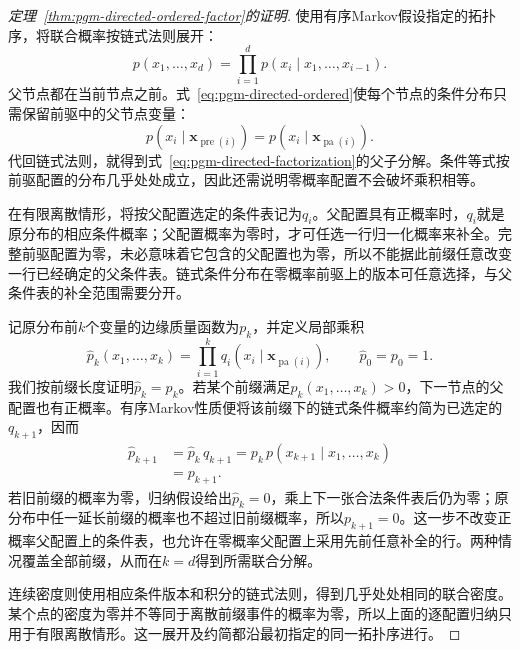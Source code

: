 \begin{proof}[定理~\ref{thm:pgm-directed-ordered-factor}的证明]
使用有序Markov假设指定的拓扑序，将联合概率按链式法则展开：
\[
  p(x_1,\ldots,x_d)=
  \prod_{i=1}^{d}p(x_i\mid x_1,\ldots,x_{i-1}).
\]
父节点都在当前节点之前。式~\eqref{eq:pgm-directed-ordered}使每个节点的条件分布只需保留前驱中的父节点变量：
\[
  p(x_i\mid\bm{x}_{\operatorname{pre}(i)})
    =p(x_i\mid\bm{x}_{\operatorname{pa}(i)}).
\]
代回链式法则，就得到式~\eqref{eq:pgm-directed-factorization}的父子分解。条件等式按前驱配置的分布几乎处处成立，因此还需说明零概率配置不会破坏乘积相等。

在有限离散情形，将按父配置选定的条件表记为$q_i$。父配置具有正概率时，$q_i$就是原分布的相应条件概率；父配置概率为零时，才可任选一行归一化概率来补全。完整前驱配置为零，未必意味着它包含的父配置也为零，所以不能据此前缀任意改变一行已经确定的父条件表。链式条件分布在零概率前驱上的版本可任意选择，与父条件表的补全范围需要分开。

记原分布前$k$个变量的边缘质量函数为$p_k$，并定义局部乘积
\[
  \widehat p_k(x_1,\ldots,x_k)
    =\prod_{i=1}^k q_i(x_i\mid\bm{x}_{\operatorname{pa}(i)}),
  \qquad \widehat p_0=p_0=1.
\]
我们按前缀长度证明$\widehat p_k=p_k$。若某个前缀满足$p_k(x_1,\ldots,x_k)>0$，下一节点的父配置也有正概率。有序Markov性质便将该前缀下的链式条件概率约简为已选定的$q_{k+1}$，因而
\[
  \begin{aligned}
    \widehat p_{k+1}
      &=\widehat p_k\,q_{k+1}
       =p_k\,p(x_{k+1}\mid x_1,\ldots,x_k)\\
      &=p_{k+1}.
  \end{aligned}
\]
若旧前缀的概率为零，归纳假设给出$\widehat p_k=0$，乘上下一张合法条件表后仍为零；原分布中任一延长前缀的概率也不超过旧前缀概率，所以$p_{k+1}=0$。这一步不改变正概率父配置上的条件表，也允许在零概率父配置上采用先前任意补全的行。两种情况覆盖全部前缀，从而在$k=d$得到所需联合分解。

连续密度则使用相应条件版本和积分的链式法则，得到几乎处处相同的联合密度。某个点的密度为零并不等同于离散前缀事件的概率为零，所以上面的逐配置归纳只用于有限离散情形。这一展开及约简都沿最初指定的同一拓扑序进行。
\end{proof}

